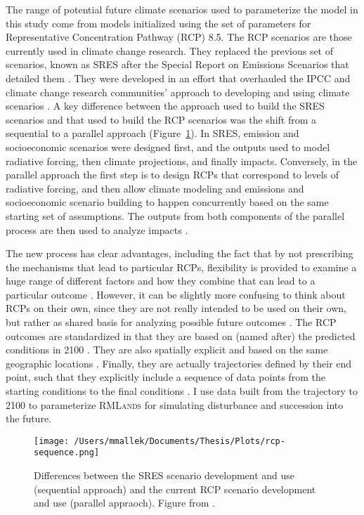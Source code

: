 The range of potential future climate scenarios used to parameterize the model in this study come from models initialized using the set of parameters for Representative Concentration Pathway (RCP) 8.5. The RCP scenarios are those currently used in climate change research. They replaced the previous set of scenarios, known as SRES after the Special Report on Emissions Scenarios that detailed them \citep{VanVuuren2011a}. They were developed in an effort that overhauled the IPCC and climate change research communities' approach to developing and using climate scenarios \citep{Moss2008}. A key difference between the approach used to build the SRES scenarios and that used to build the RCP scenarios was the shift from a sequential to a parallel approach (Figure~\ref{fig:scenarioapproach}). In SRES, emission and socioeconomic scenarios were designed first, and the outputs used to model radiative forcing, then climate projections, and finally impacts. Conversely, in the parallel approach the first step is to design RCPs that correspond to levels of radiative forcing, and then allow climate modeling and emissions and socioeconomic scenario building to happen concurrently based on the same starting set of assumptions. The outputs from both components of the parallel process are then used to analyze impacts \citep{Moss2010}. 

The new process has clear advantages, including the fact that by not prescribing the mechanisms that lead to particular RCPs, flexibility is provided to examine a huge range of different factors and how they combine that can lead to a particular outcome \citep{VanVuuren2011}. However, it can be slightly more confusing to think about RCPs on their own, since they are not really intended to be used on their own, but rather as shared basis for analyzing possible future outcomes \citep{VanVuuren2011}. The RCP outcomes are standardized in that they are based on (named after) the predicted conditions in 2100 \citep{VanVuuren2011a}. They are also spatially explicit and based on the same geographic locations \citep{VanVuuren2011a}. Finally, they are actually trajectories defined by their end point, such that they explicitly include a sequence of data points from the starting conditions to the final conditions \citep{VanVuuren2011}. I use data built from the trajectory to 2100 to parameterize \textsc{RMLands} for simulating disturbance and succession into the future.

\begin{figure}[!htbp]
\texttt{[image: /Users/mmallek/Documents/Thesis/Plots/rcp-sequence.png]}
\caption{Differences between the SRES scenario development and use (sequential approach) and the current RCP scenario development and use (parallel appraoch). Figure from \citet{Moss2008}.}
\label{fig:scenarioapproach}
\end{figure}

